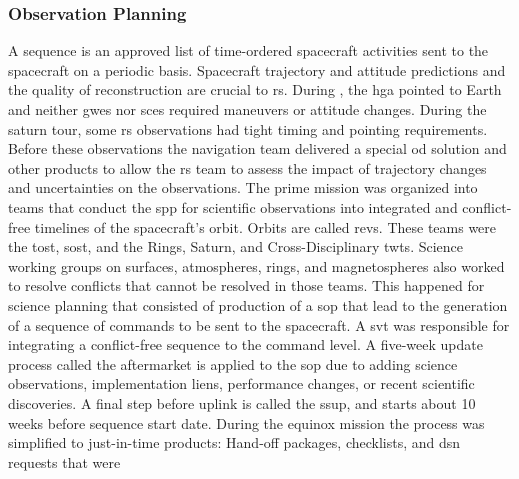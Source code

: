 \documentclass[crop=false,class=article,oneside]{standalone}
\begin{document}
        \subsubsection{\footnotesize{Observation Planning}}
            \label{subsubsec:usr_obs_planning}
            A \gls{sequence} is an approved list of
            time-ordered spacecraft activities sent to the
            spacecraft on a periodic basis. Spacecraft
            \gls{trajectory} and \gls{attitude} predictions
            and the quality of reconstruction are crucial to
            \gls{rs}. During ,
            the \gls{hga} pointed to Earth and neither
            \glspl{gwe} nor \glspl{sce} required maneuvers or
            \gls{attitude} changes. During the
            \gls{saturn tour}, some \gls{rs} observations had
            tight timing and pointing requirements. Before
            these observations the navigation team delivered
            a special \gls{od} solution and other products
            to allow the \gls{rs} team to assess the impact
            of trajectory changes and uncertainties on the
            observations. The \gls{prime mission} was
            organized into teams that conduct the \gls{spp}
            for scientific observations into integrated and
            conflict-free timelines of the spacecraft's orbit.
            Orbits are called \glspl{rev}. These teams were
            the \gls{tost}, \gls{sost}, and the Rings, Saturn,
            and Cross-Disciplinary \glspl{twt}. Science
            working groups on surfaces, atmospheres, rings,
            and \glspl{magnetosphere} also worked to resolve
            conflicts that cannot be resolved in those teams.
            This happened for science planning that consisted
            of production of a \gls{sop} that lead to the
            generation of a sequence of commands to be sent
            to the spacecraft. A \gls{svt} was responsible
            for integrating a conflict-free sequence to the
            command level. A five-week update process called
            the aftermarket is applied to the \gls{sop} due
            to adding science observations, implementation
            liens, performance changes, or recent scientific
            discoveries. A final step before \gls{uplink}
            is called the \gls{ssup}, and starts about
            10 weeks before sequence start date. During the
            \gls{equinox mission} the process was simplified
            to just-in-time products: Hand-off packages,
            checklists, and \gls{dsn} requests that were
\end{document}
